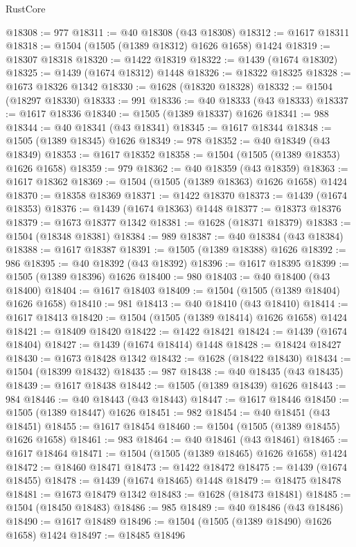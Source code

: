 \begin{lexlean}{RustCore}
\begin{coremodule}
@18308 := 977
@18311 := @40 @18308 (@43 @18308)
@18312 := @1617 @18311
@18318 := @1504 (@1505 (@1389 @18312) @1626 @1658) @1424
@18319 := @18307 @18318
@18320 := @1422 @18319
@18322 := @1439 (@1674 @18302)
@18325 := @1439 (@1674 @18312) @1448
@18326 := @18322 @18325
@18328 := @1673 @18326 @1342
@18330 := @1628 (@18320 @18328)
@18332 := @1504 (@18297 @18330)
@18333 := 991
@18336 := @40 @18333 (@43 @18333)
@18337 := @1617 @18336
@18340 := @1505 (@1389 @18337) @1626
@18341 := 988
@18344 := @40 @18341 (@43 @18341)
@18345 := @1617 @18344
@18348 := @1505 (@1389 @18345) @1626
@18349 := 978
@18352 := @40 @18349 (@43 @18349)
@18353 := @1617 @18352
@18358 := @1504 (@1505 (@1389 @18353) @1626 @1658)
@18359 := 979
@18362 := @40 @18359 (@43 @18359)
@18363 := @1617 @18362
@18369 := @1504 (@1505 (@1389 @18363) @1626 @1658) @1424
@18370 := @18358 @18369
@18371 := @1422 @18370
@18373 := @1439 (@1674 @18353)
@18376 := @1439 (@1674 @18363) @1448
@18377 := @18373 @18376
@18379 := @1673 @18377 @1342
@18381 := @1628 (@18371 @18379)
@18383 := @1504 (@18348 @18381)
@18384 := 989
@18387 := @40 @18384 (@43 @18384)
@18388 := @1617 @18387
@18391 := @1505 (@1389 @18388) @1626
@18392 := 986
@18395 := @40 @18392 (@43 @18392)
@18396 := @1617 @18395
@18399 := @1505 (@1389 @18396) @1626
@18400 := 980
@18403 := @40 @18400 (@43 @18400)
@18404 := @1617 @18403
@18409 := @1504 (@1505 (@1389 @18404) @1626 @1658)
@18410 := 981
@18413 := @40 @18410 (@43 @18410)
@18414 := @1617 @18413
@18420 := @1504 (@1505 (@1389 @18414) @1626 @1658) @1424
@18421 := @18409 @18420
@18422 := @1422 @18421
@18424 := @1439 (@1674 @18404)
@18427 := @1439 (@1674 @18414) @1448
@18428 := @18424 @18427
@18430 := @1673 @18428 @1342
@18432 := @1628 (@18422 @18430)
@18434 := @1504 (@18399 @18432)
@18435 := 987
@18438 := @40 @18435 (@43 @18435)
@18439 := @1617 @18438
@18442 := @1505 (@1389 @18439) @1626
@18443 := 984
@18446 := @40 @18443 (@43 @18443)
@18447 := @1617 @18446
@18450 := @1505 (@1389 @18447) @1626
@18451 := 982
@18454 := @40 @18451 (@43 @18451)
@18455 := @1617 @18454
@18460 := @1504 (@1505 (@1389 @18455) @1626 @1658)
@18461 := 983
@18464 := @40 @18461 (@43 @18461)
@18465 := @1617 @18464
@18471 := @1504 (@1505 (@1389 @18465) @1626 @1658) @1424
@18472 := @18460 @18471
@18473 := @1422 @18472
@18475 := @1439 (@1674 @18455)
@18478 := @1439 (@1674 @18465) @1448
@18479 := @18475 @18478
@18481 := @1673 @18479 @1342
@18483 := @1628 (@18473 @18481)
@18485 := @1504 (@18450 @18483)
@18486 := 985
@18489 := @40 @18486 (@43 @18486)
@18490 := @1617 @18489
@18496 := @1504 (@1505 (@1389 @18490) @1626 @1658) @1424
@18497 := @18485 @18496

\end{coremodule}
\end{lexlean}
